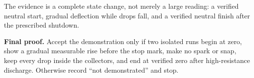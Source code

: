{\noindent The evidence is a complete state change, not merely a large reading:
a verified neutral start, gradual deflection while drops fall, and a verified
neutral finish after the prescribed shutdown.

\medskip
\noindent\textbf{Final proof.} Accept the demonstration only if two isolated
runs begin at zero, show a gradual measurable rise before the stop mark, make
no spark or snap, keep every drop inside the collectors, and end at verified
zero after high-resistance discharge. Otherwise record ``not demonstrated''
and stop.}

